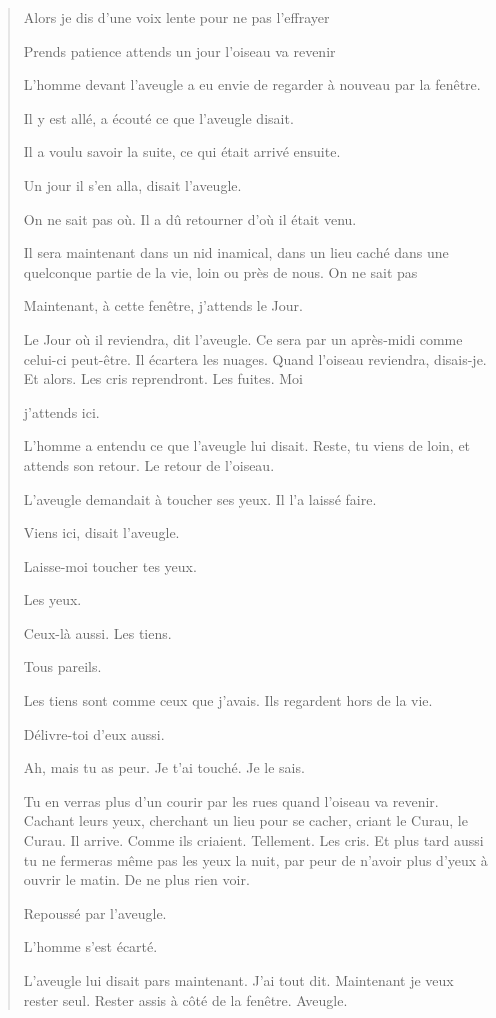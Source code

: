 \begin{quote}
Alors je dis d'une voix lente pour ne pas l'effrayer

Prends patience attends un jour l'oiseau va revenir

L'homme devant l'aveugle a eu envie de regarder à nouveau par la
fenêtre.

Il y est allé, a écouté ce que l'aveugle disait.

Il a voulu savoir la suite, ce qui était arrivé ensuite.

Un jour il s'en alla, disait l'aveugle.

On ne sait pas où. Il a dû retourner d'où il était venu.

Il sera maintenant dans un nid inamical, dans un lieu caché dans une
quelconque partie de la vie, loin ou près de nous. On ne sait pas

Maintenant, à cette fenêtre, j'attends le Jour.

Le Jour où il reviendra, dit l'aveugle. Ce sera par un après-midi comme
celui-ci peut-être. Il écartera les nuages. Quand l'oiseau reviendra,
disais-je. Et alors. Les cris reprendront. Les fuites. Moi

j'attends ici.

L'homme a entendu ce que l'aveugle lui disait. Reste, tu viens de loin,
et attends son retour. Le retour de l'oiseau.

L'aveugle demandait à toucher ses yeux. Il l'a laissé faire.

Viens ici, disait l'aveugle.

Laisse-moi toucher tes yeux.

Les yeux.

Ceux-là aussi. Les tiens.

Tous pareils.

Les tiens sont comme ceux que j'avais. Ils regardent hors de la vie.

Délivre-toi d'eux aussi.

Ah, mais tu as peur. Je t'ai touché. Je le sais.

Tu en verras plus d'un courir par les rues quand l'oiseau va revenir.
Cachant leurs yeux, cherchant un lieu pour se cacher, criant le Curau,
le Curau. Il arrive. Comme ils criaient. Tellement. Les cris. Et plus
tard aussi tu ne fermeras même pas les yeux la nuit, par peur de n'avoir
plus d'yeux à ouvrir le matin. De ne plus rien voir.

Repoussé par l'aveugle.

L'homme s'est écarté.

L'aveugle lui disait pars maintenant. J'ai tout dit. Maintenant je veux
rester seul. Rester assis à côté de la fenêtre. Aveugle.


\end{quote}
